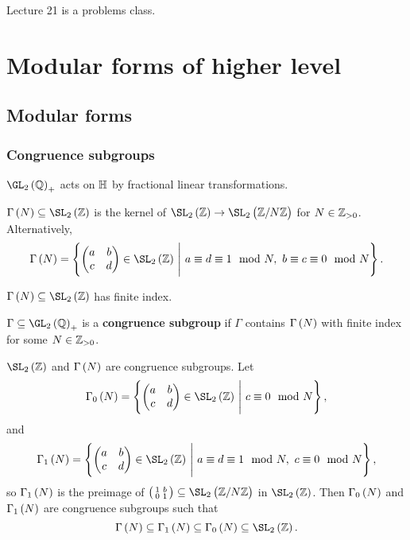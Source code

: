 
Lecture 21 is a problems class.

\pagebreak

\section{Modular forms of higher level}

\subsection{Modular forms}

\subsubsection{Congruence subgroups}


$ \GL_2\br{\QQ}_+ $ acts on $ \mathbb{H} $ by fractional linear transformations.

\begin{definition}
$ \Gamma\br{N} \subseteq \SL_2\br{\ZZ} $ is the kernel of $ \SL_2\br{\ZZ} \to \SL_2\br{\ZZ / N\ZZ} $ for $ N \in \mathbb{Z}_{> 0} $. Alternatively,
$$ \Gamma\br{N} = \cbr{\twobytwo{a}{b}{c}{d} \in \SL_2\br{\ZZ} \st a \equiv d \equiv 1 \mod N, \ b \equiv c \equiv 0 \mod N}. $$
\end{definition}

\begin{note*}
$ \Gamma\br{N} \subseteq \SL_2\br{\ZZ} $ has finite index.
\end{note*}

\begin{definition}
$ \Gamma \subseteq \GL_2\br{\QQ}_+ $ is a \textbf{congruence subgroup} if $ \Gamma $ contains $ \Gamma\br{N} $ with finite index for some $ N \in \mathbb{Z}_{> 0} $.
\end{definition}

\begin{example*}
$ \SL_2\br{\ZZ} $ and $ \Gamma\br{N} $ are congruence subgroups. Let
$$ \Gamma_0\br{N} = \cbr{\twobytwo{a}{b}{c}{d} \in \SL_2\br{\ZZ} \st c \equiv 0 \mod N}, $$
and
$$ \Gamma_1\br{N} = \cbr{\twobytwo{a}{b}{c}{d} \in \SL_2\br{\ZZ} \st a \equiv d \equiv 1 \mod N, \ c \equiv 0 \mod N}, $$
so $ \Gamma_1\br{N} $ is the preimage of $ \twobytwosmall{1}{b}{0}{1} \subseteq \SL_2\br{\ZZ / N\ZZ} $ in $ \SL_2\br{\ZZ} $. Then $ \Gamma_0\br{N} $ and $ \Gamma_1\br{N} $ are congruence subgroups such that
$$ \Gamma\br{N} \subseteq \Gamma_1\br{N} \subseteq \Gamma_0\br{N} \subseteq \SL_2\br{\ZZ}. $$
\end{example*}

